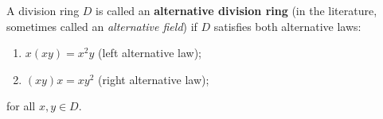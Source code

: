 A division ring $D$ is called an \textbf{alternative division ring} (in the literature, sometimes called an \textit{alternative field}) if $D$ satisfies both alternative laws:
\begin{enumerate}
\item $x(xy) = x^2y$ \quad (left alternative law);
\item $(xy)x = xy^2$ \quad (right alternative law);
\end{enumerate}
for all $x, y \in D$.
